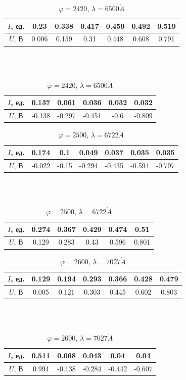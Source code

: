 \documentclass[a4paper, 12pt]{article}
\renewcommand{\phi}{\varphi}
\renewcommand{\AA}{\ensuremath{\mathring{A}}}
\begin{document}
\begin{table}[!h]
    \centering
    \begin{tabular}{|c|c|c|c|c|c|c|}
        \hline
        $I$, ед. & 0.23 & 0.338 & 0.417 & 0.459 & 0.492 & 0.519\\ \hline
        $U$, В   & 0.006 & 0.159 & 0.31 & 0.448 & 0.608 & 0.791
        \\ \hline
    \end{tabular}
    \\~\\
    \begin{tabular}{|c|c|c|c|c|c|}
        \hline
        $I$, ед. & 0.137 & 0.061 & 0.036 & 0.032 & 0.032\\ \hline
        $U$, В   & -0.138 & -0.297 & -0.451 & -0.6 & -0.809
        \\ \hline
    \end{tabular}
    \caption {$\phi = 2420$, $\lambda = 6500 \AA$}
\end{table}

\begin{table}[!h]
    \centering
    \begin{tabular}{|c|c|c|c|c|c|c|}
        \hline
        $I$, ед. & 0.174 & 0.1 & 0.049 & 0.037 & 0.035 & 0.035\\ \hline
        $U$, В   & -0.022 & -0.15 & -0.294 & -0.435 & -0.594 & -0.797
        \\ \hline
    \end{tabular}
    \\~\\
    \begin{tabular}{|c|c|c|c|c|c|}
        \hline
        $I$, ед. & 0.274 & 0.367 & 0.429 & 0.474 & 0.51\\ \hline
        $U$, В   & 0.129 & 0.283 & 0.43 & 0.596 & 0.801
        \\ \hline
    \end{tabular}
    \caption {$\phi = 2500$, $\lambda = 6722 \AA$}
\end{table}

\begin{table}[!h]
    \centering
    \begin{tabular}{|c|c|c|c|c|c|c|}
        \hline
        $I$, ед. & 0.129 & 0.194 & 0.293 & 0.366 & 0.428 & 0.479\\ \hline
        $U$, В   & 0.005 & 0.121 & 0.303 & 0.445 & 0.602 & 0.803
        \\ \hline
    \end{tabular}
    \\~\\
    \begin{tabular}{|c|c|c|c|c|c|}
        \hline
        $I$, ед. & 0.511 & 0.068 & 0.043 & 0.04 & 0.04\\ \hline
        $U$, В   & 0.994 & -0.138 & -0.284 & -0.442 & -0.607
        \\ \hline
    \end{tabular}
    \caption {$\phi = 2600$, $\lambda = 7027 \AA$}
\end{table}
\end{document}
